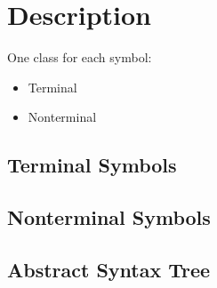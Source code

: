 
\section{Description}


One class for each symbol: 
\begin{itemize}
    \item Terminal
    \item Nonterminal
\end{itemize}


\subsection{Terminal Symbols}

\subsection{Nonterminal Symbols}

\subsection{Abstract Syntax Tree}


